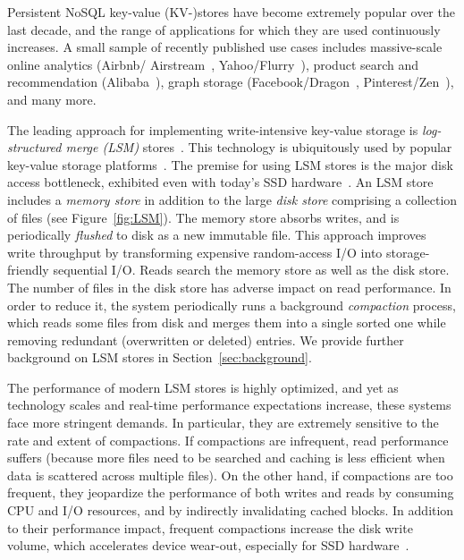 
Persistent NoSQL key-value (KV-)stores have become extremely popular over the last decade, 
and the range of applications for which they are used continuously increases. A small sample of  recently 
published use cases includes massive-scale online analytics (Airbnb/ Airstream~\cite{airbnb}, 
Yahoo/Flurry~\cite{flurry}), product search 
and recommendation (Alibaba~\cite{alibabahbase}), 
graph storage (Facebook/Dragon~\cite{dragon}, 
Pinterest/Zen~\cite{zen}), and many more. 

The leading approach for implementing write-intensive key-value storage is \emph{log-structured merge (LSM)} stores~\cite{O'Neil:1996}.
This technology is ubiquitously used by popular key-value storage platforms~\cite{leveldb, rocksdb, scylladb, Chang2008, cassandra, hbase, mongodb, mysql}. 
The premise for using LSM stores is the major disk access bottleneck, exhibited even with today's SSD hardware~\cite{rocksdb,Tanenbaum:2014:MOS:2655363,Wu:2012:AWB:2093139.2093140}. 
An LSM store includes a \emph{memory store} in addition to the large \emph{disk store} comprising a collection of files
(see Figure~\ref{fig:LSM}). 
The memory store absorbs writes, and is periodically \emph{flushed} to disk as a new immutable file. 
This approach improves write throughput by transforming expensive random-access I/O into storage-friendly sequential I/O. 
Reads search the memory store as well as the disk store. The number of files in the disk store has adverse impact on read performance. 
In order to reduce it, the system periodically runs a background \emph{compaction} process, which reads some files from 
disk and merges them into a single sorted one while removing redundant (overwritten or deleted) entries.
We provide further background on LSM stores in Section~\ref{sec:background}.

The performance of modern LSM stores is highly optimized, and yet as technology scales and real-time 
performance expectations increase, these systems face more stringent  demands. In particular, 
they are extremely sensitive to the rate and extent of compactions. If compactions are infrequent, read performance
suffers (because more files need to be searched and caching is less efficient when  data is scattered across multiple files). On the other hand, if 
compactions are too frequent, they jeopardize the performance of both writes and reads by consuming CPU and I/O resources, and by indirectly invalidating cached blocks. 
In addition to their performance impact, frequent compactions increase the disk write volume, which  
accelerates device wear-out, especially for SSD hardware~\cite{Hu:2009}. 

